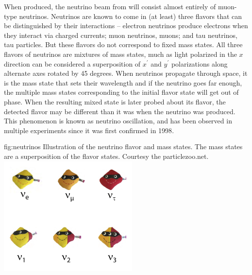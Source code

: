\documentclass[../main-v1.tex]{subfiles}
\begin{document}
When produced, the neutrino beam from  will consist almost entirely of muon-type neutrinos. %
Neutrinos are known to come in (at least) three flavors that can be distinguished by their interactions -- electron %
neutrinos produce electrons when they interact via charged currents; muon neutrinos, muons; and tau neutrinos, tau particles.  But these flavors do not correspond to fixed mass states.  All three flavors of neutrinos are mixtures of mass states, much as  light polarized in the $x$ direction  can be considered a superposition of  $x^\prime$ and $y^\prime$ polarizations along  alternate axes rotated by 45 degrees.  When neutrinos propagate through space, it is the mass state that sets their wavelength and if the neutrino goes far enough, the multiple mass states  corresponding to the initial flavor state will get out of phase.  When the resulting  mixed state is later probed about its flavor, the detected flavor may be different than it was when the neutrino was produced. %
This phenomenon is known as neutrino oscillation, and has been %
observed in multiple experiments since it was first confirmed in 1998\cite{Kajita2006}.


\begin{dunefigure}
{fig:neutrinos}
{Illustration of the neutrino flavor and mass states.  The mass states are a superposition of the flavor states.  Courtesy the particlezoo.net.}
\includegraphics[height=6cm]{graphics/IntroFigures/Fig_01_neutrinos.jpg}
\end{dunefigure}
\end{document}
